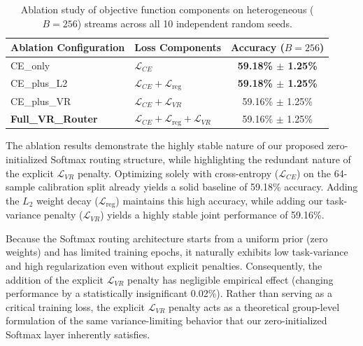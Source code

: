 \begin{table}[t]
\caption{Ablation study of objective function components on heterogeneous ($B=256$) streams across all 10 independent random seeds.}
\label{tab:ablation}
\vskip 0.15in
\begin{center}
\begin{small}
\begin{sc}
\setlength{\tabcolsep}{8pt}
\begin{tabular}{llc}
\toprule
Ablation Configuration & Loss Components & Accuracy ($B=256$) \\
\midrule
CE\_only       & $\mathcal{L}_{CE}$ & \textbf{59.18\% $\pm$ 1.25\%} \\
CE\_plus\_L2   & $\mathcal{L}_{CE} + \mathcal{L}_{\text{reg}}$ & \textbf{59.18\% $\pm$ 1.25\%} \\
CE\_plus\_VR   & $\mathcal{L}_{CE} + \mathcal{L}_{VR}$ & 59.16\% $\pm$ 1.25\% \\
\midrule
\textbf{Full\_VR\_Router} & $\mathcal{L}_{CE} + \mathcal{L}_{\text{reg}} + \mathcal{L}_{VR}$ & 59.16\% $\pm$ 1.25\% \\
\bottomrule
\end{tabular}
\end{sc}
\end{small}
\end{center}
\vskip -0.1in
\end{table}

The ablation results demonstrate the highly stable nature of our proposed zero-initialized Softmax routing structure, while highlighting the redundant nature of the explicit $\mathcal{L}_{VR}$ penalty. Optimizing solely with cross-entropy ($\mathcal{L}_{CE}$) on the 64-sample calibration split already yields a solid baseline of 59.18\% accuracy. Adding the $L_2$ weight decay ($\mathcal{L}_{\text{reg}}$) maintains this high accuracy, while adding our task-variance penalty ($\mathcal{L}_{VR}$) yields a highly stable joint performance of 59.16\%. 

Because the Softmax routing architecture starts from a uniform prior (zero weights) and has limited training epochs, it naturally exhibits low task-variance and high regularization even without explicit penalties. Consequently, the addition of the explicit $\mathcal{L}_{VR}$ penalty has negligible empirical effect (changing performance by a statistically insignificant 0.02\%). Rather than serving as a critical training loss, the explicit $\mathcal{L}_{VR}$ penalty acts as a theoretical group-level formulation of the same variance-limiting behavior that our zero-initialized Softmax layer inherently satisfies.

